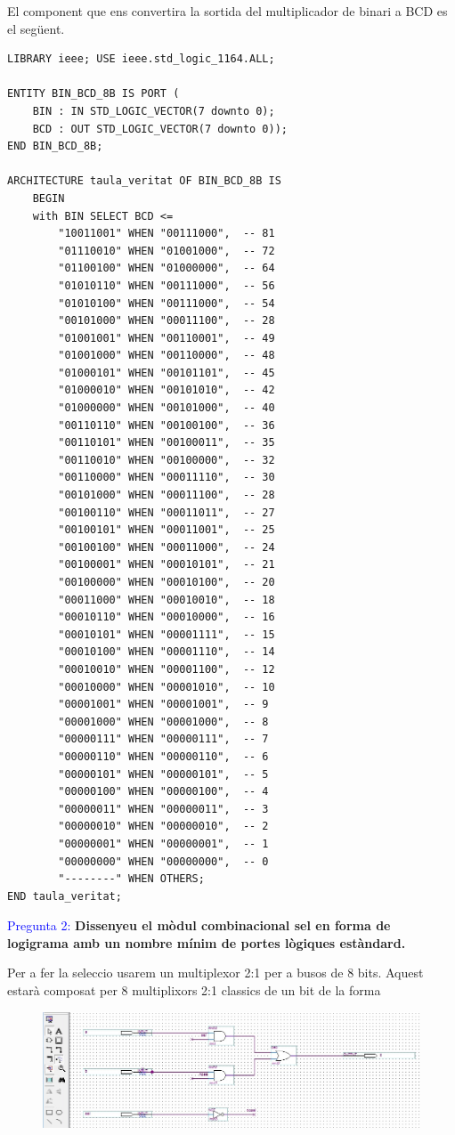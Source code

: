 \documentclass[12pt, a4papre]{article}
\begin{document}
	El component que ens convertira la sortida del multiplicador de binari a BCD es el següent.
	\begin{lstlisting}[style=vhdl, frame=single, basicstyle=\tiny]
LIBRARY ieee; USE ieee.std_logic_1164.ALL;  

ENTITY BIN_BCD_8B IS PORT (   
	BIN : IN STD_LOGIC_VECTOR(7 downto 0);   
	BCD : OUT STD_LOGIC_VECTOR(7 downto 0)); 
END BIN_BCD_8B;  

ARCHITECTURE taula_veritat OF BIN_BCD_8B IS   
	BEGIN 
	with BIN SELECT BCD <=     	
		"10011001" WHEN "00111000",  -- 81     
		"01110010" WHEN "01001000",  -- 72      
		"01100100" WHEN "01000000",  -- 64     
		"01010110" WHEN "00111000",  -- 56     
		"01010100" WHEN "00111000",  -- 54     
		"00101000" WHEN "00011100",  -- 28     
		"01001001" WHEN "00110001",  -- 49     
		"01001000" WHEN "00110000",  -- 48     
		"01000101" WHEN "00101101",  -- 45     
		"01000010" WHEN "00101010",  -- 42     
		"01000000" WHEN "00101000",  -- 40     
		"00110110" WHEN "00100100",  -- 36     
		"00110101" WHEN "00100011",  -- 35     
		"00110010" WHEN "00100000",  -- 32     
		"00110000" WHEN "00011110",  -- 30     
		"00101000" WHEN "00011100",  -- 28     
		"00100110" WHEN "00011011",  -- 27     
		"00100101" WHEN "00011001",  -- 25     
		"00100100" WHEN "00011000",  -- 24     
		"00100001" WHEN "00010101",  -- 21     
		"00100000" WHEN "00010100",  -- 20     
		"00011000" WHEN "00010010",  -- 18     
		"00010110" WHEN "00010000",  -- 16     
		"00010101" WHEN "00001111",  -- 15     
		"00010100" WHEN "00001110",  -- 14     
		"00010010" WHEN "00001100",  -- 12     
		"00010000" WHEN "00001010",  -- 10     
		"00001001" WHEN "00001001",  -- 9     
		"00001000" WHEN "00001000",  -- 8     
		"00000111" WHEN "00000111",  -- 7     
		"00000110" WHEN "00000110",  -- 6     
		"00000101" WHEN "00000101",  -- 5     
		"00000100" WHEN "00000100",  -- 4    
		"00000011" WHEN "00000011",  -- 3     
		"00000010" WHEN "00000010",  -- 2     
		"00000001" WHEN "00000001",  -- 1     
		"00000000" WHEN "00000000",  -- 0     
		"--------" WHEN OTHERS;   
END taula_veritat;
\end{lstlisting}

	\textcolor{blue}{Pregunta 2:} \textbf{Dissenyeu el mòdul combinacional sel en forma de logigrama amb un nombre mínim de portes lògiques estàndard.} 
	 
	Per a fer la seleccio usarem un multiplexor 2:1 per a busos de 8 bits. Aquest estarà composat per 8 multiplixors 2:1 classics de un bit de la forma
	\begin{figure}[H]
		\begin{center}
		\includegraphics[width=130mm]{multiplexor2_1.jpeg}
		\end{center}
	\end{figure}
	
\end{document}
